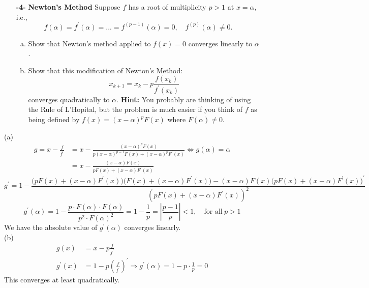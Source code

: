 \documentclass[11pt]{article}
\theoremstyle{definition}
\newcommand{\1}[1]{\mathbf{1} \left \{ #1 \right \}}
\begin{document}
\begin{itemize}
    \item[{\textbf{-4-}}] \textbf{Newton's Method}  Suppose $f$ has a root of multiplicity $p>1$ at $x=\alpha$, i.e.,
    \begin{equation}
        f(\alpha) = f^{\prime} (\alpha) = ... = f^{(p-1)} (\alpha) = 0, \quad f^{(p)} (\alpha) \neq 0.
    \end{equation}
    \begin{enumerate}[a.]
        \item Show that Newton's method applied to $f(x) = 0$ converges linearly to $\alpha$.
        \item Show that this modification of Newton's Method:
        \begin{equation}
            x_{k+1} = x_k - p \frac{f(x_k)}{f^{\prime}(x_k)}
        \end{equation}
        converges quadratically to $\alpha$.  \textbf{Hint:}  You probably are thinking of using the Rule of L'Hopital, but the problem is much easier if you think of $f$ as being defined by $f(x) = (x-\alpha)^p F(x)$ where $F(\alpha) \neq 0.$
        \end{enumerate}
\end{itemize}
(a)
\begin{equation*}
    \begin{split}
        g = x - \frac{f}{f^{\prime}} &= x - \frac{(x-\alpha)^p F(x)}{p(x-\alpha)^{p-1} F(x) + (x-\alpha)^p F^{\prime} (x)} \Longleftrightarrow g(\alpha) = \alpha \\
        &= x - \frac{(x-\alpha) F(x)}{pF(x) + (x-\alpha)F^{\prime}(x)}
    \end{split}
\end{equation*}
\[g^{\prime} = 1 - \frac{\big(pF(x) + (x-\alpha)F^{\prime}(x)\big) \big(F(x) + (x-\alpha)F^{\prime}(x)\big) - (x-\alpha)F(x) \big(pF(x) + (x-\alpha)F^{\prime}(x)\big)^{\prime}}{\left(pF(x) + (x-\alpha)F^{\prime}(x)\right)^2}\]
\[g^{\prime}(\alpha) = 1 - \frac{p \cdot F(\alpha) \cdot F(\alpha)}{p^2 \cdot F(\alpha)^2} = 1 - \frac{1}{p} = \left|\frac{p-1}{p}\right| < 1, \quad \text{for all} \ p > 1\]
We have the absolute value of $g^{\prime}(\alpha)$ converges linearly. \\
(b)
\begin{equation*}
    \begin{split}
        g(x) &= x - p \frac{f}{f^{\prime}} \\
        g^{\prime}(x) &= 1 - p \left(\frac{f}{f^{\prime}}\right)^{\prime} \Longrightarrow g^{\prime}(\alpha) = 1 - p \cdot \frac{1}{p} = 0
    \end{split}
\end{equation*}
This converges at least quadratically.
\end{document}
